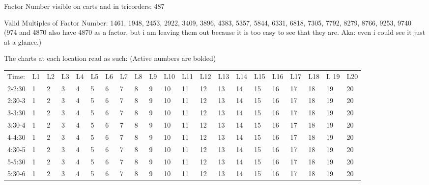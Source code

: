 \documentclass[green]{elementals}
\begin{document}
\name{\gActiveConduitLocations{}}

Factor Number visible on carts and in tricorders: 487

Valid Multiples of Factor Number: 1461, 1948, 2453, 2922, 3409, 3896, 4383, 5357, 5844, 6331, 6818, 7305, 7792, 8279, 8766, 9253, 9740 (974 and 4870 also have 4870 as a factor, but i am leaving them out because it is too easy to see that they are. Aka: even i could see it just at a glance.)

The charts at each location read as such: (Active numbers are bolded)
\begin{tabular}{| l | l |  l | l | l | l | l | l | l | l | l | l | l | l | l | l | l | l | l | l | l |}
  Time: & L1 & L2 & L3 & L4 & L5 & L6 & L7 & L8 & L9 & L10 & L11 & L12 & L13 & L14 & L15 & L16 & L17 & L18 & L 19 & L20 \\
  2-2:30 & 1 & 2 & 3 & 4 & 5 & 6 & 7 & 8 & 9  & 10 & 11 & 12 & 13 & 14 & 15 & 16 & 17 & 18 & 19 & 20 \\
  2:30-3 & 1 & 2 & 3 & 4 & 5 & 6 & 7 & 8 & 9  & 10 & 11 & 12 & 13 & 14 & 15 & 16 & 17 & 18 & 19 & 20 \\
  3-3:30 & 1 & 2 & 3 & 4 & 5 & 6 & 7 & 8 & 9  & 10 & 11 & 12 & 13 & 14 & 15 & 16 & 17 & 18 & 19 & 20 \\
  3:30-4 & 1 & 2 & 3 & 4 & 5 & 6 & 7 & 8 & 9  & 10 & 11 & 12 & 13 & 14 & 15 & 16 & 17 & 18 & 19 & 20 \\
  4-4:30 & 1 & 2 & 3 & 4 & 5 & 6 & 7 & 8 & 9  & 10 & 11 & 12 & 13 & 14 & 15 & 16 & 17 & 18 & 19 & 20 \\
  4:30-5 & 1 & 2 & 3 & 4 & 5 & 6 & 7 & 8 & 9  & 10 & 11 & 12 & 13 & 14 & 15 & 16 & 17 & 18 & 19 & 20 \\
  5-5:30 & 1 & 2 & 3 & 4 & 5 & 6 & 7 & 8 & 9  & 10 & 11 & 12 & 13 & 14 & 15 & 16 & 17 & 18 & 19 & 20 \\
  5:30-6 & 1 & 2 & 3 & 4 & 5 & 6 & 7 & 8 & 9  & 10 & 11 & 12 & 13 & 14 & 15 & 16 & 17 & 18 & 19 & 20 \\  
\end{tabular}
\end{document}
